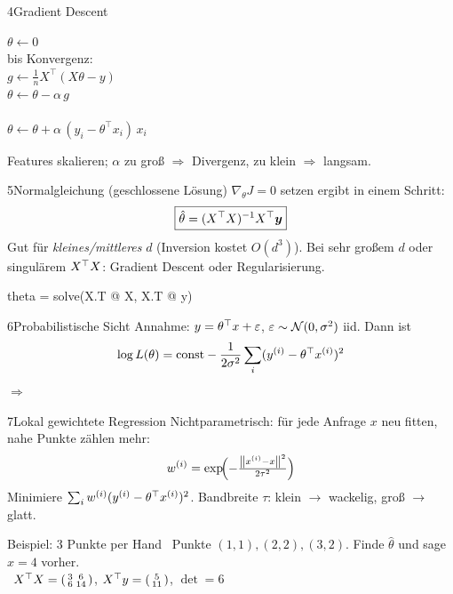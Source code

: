 \begin{hngrid}
\begin{hnp}[raster multicolumn=3,acc=hnnavy]{4}{Gradient Descent}
\begin{pcode}
 $\theta\leftarrow 0$\\
 bis Konvergenz:\\
\hii $g\leftarrow \tfrac1n X^{\top}(X\theta-y)$\\
\hii $\theta\leftarrow\theta-\alpha\,g$\\
\\
\hii $\theta\leftarrow\theta+\alpha\,(y_i-\theta^{\top}x_i)\,x_i$
\end{pcode}
 Features skalieren; $\alpha$ zu groß $\Rightarrow$ Divergenz, zu klein $\Rightarrow$ langsam.
\end{hnp}
%
\begin{hnp}[raster multicolumn=3,acc=hngreen]{5}{Normalgleichung (geschlossene Lösung)}
$\nabla_\theta J=0$ setzen ergibt in einem Schritt:
\[ \boxed{\hat\theta=(X^{\top} X)^{-1}X^{\top}\bm y} \]
Gut für \emph{kleines/mittleres} $d$ (Inversion kostet $O(d^3)$). Bei sehr großem $d$ oder singulärem $X^{\top} X$: Gradient Descent oder Regularisierung.
\begin{pcode}
theta = solve(X.T @ X, X.T @ y)\\
\end{pcode}
\end{hnp}
%
\begin{hnp}[raster multicolumn=2,acc=hnrose]{6}{Probabilistische Sicht}
Annahme: $y=\theta^{\top} x+\varepsilon$, $\varepsilon\sim\mathcal{N}(0,\sigma^2)$ iid. Dann ist
\[ \log L(\theta)=\text{const}-\frac{1}{2\sigma^2}\sum_i(y^{(i)}-\theta^{\top} x^{(i)})^2 \]
$\Rightarrow$ 
\end{hnp}
%
\begin{hnp}[raster multicolumn=2,acc=hnpurple]{7}{Lokal gewichtete Regression}
Nichtparametrisch: für jede Anfrage $x$ neu fitten, nahe Punkte zählen mehr:
\[ w^{(i)}=\exp\!\Bigl(-\tfrac{\left\lVert x^{(i)}-x\right\rVert^2}{2\tau^2}\Bigr) \]
Minimiere $\sum_i w^{(i)}(y^{(i)}-\theta^{\top} x^{(i)})^2$. Bandbreite $\tau$: klein $\to$ wackelig, groß $\to$ glatt.
\end{hnp}
%
\begin{hnex}[raster multicolumn=2]{Beispiel: 3 Punkte per Hand}
\hnq\ Punkte $(1,1),(2,2),(3,2)$. Finde $\hat\theta$ und sage $x=4$ vorher.\\
\hnsol\ $X^{\top} X=\begin{psmallmatrix}3&6\\6&14\end{psmallmatrix}$, $X^{\top} y=\begin{psmallmatrix}5\\11\end{psmallmatrix}$, $\det=6$\\

\end{hnex}
\end{hngrid}
